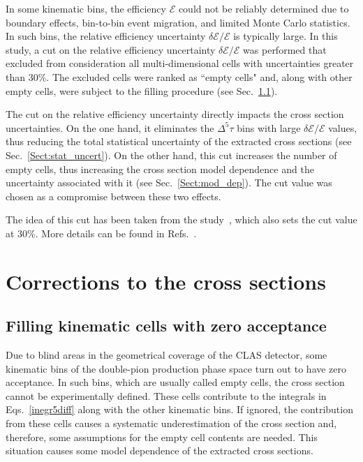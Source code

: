 \documentclass[prc,twocolumn,superscriptaddress,showpacs,amssymb,amsmath,amsfonts,aps,nofootinbib]{revtex4-1}
\begin{document}
In some kinematic bins, the efficiency $\mathcal{E}$ could not be reliably determined due to boundary effects, bin-to-bin event migration, and limited Monte Carlo statistics. In such bins, the relative efficiency uncertainty $\delta \mathcal{E}/\mathcal{E}$ is typically large. In this study, a cut on the relative efficiency uncertainty $\delta \mathcal{E}/\mathcal{E}$ was performed that excluded from consideration all multi-dimensional cells with uncertainties greater than 30\%. The excluded cells were ranked as ``empty cells" and, along with other empty cells, were subject to the filling procedure (see Sec.\!~\ref{Sect:empt_cells}).


The cut on the relative efficiency uncertainty directly impacts the cross section uncertainties. On the one hand, it eliminates the $\Delta^{5} \tau$ bins with large $\delta \mathcal{E}/\mathcal{E}$ values, thus reducing the total statistical uncertainty of the extracted cross sections (see Sec.\!~\ref{Sect:stat_uncert}). On the other hand, this cut increases the number of empty cells, thus increasing the cross section model dependence and the uncertainty associated with it (see Sec.\!~\ref{Sect:mod_dep}). The cut value was chosen as a compromise between these two effects. 

The idea of this cut has been taken from the study~\cite{Fed_an_note:2017,Fed_paper_2018}, which also sets the cut value at 30\%. More details can be found in Refs.\!~\cite{my_an_note:2020, my_thesis:2021,Fed_an_note:2017,Fed_paper_2018}.






\section{Corrections to the cross sections}

\subsection{Filling kinematic cells with zero acceptance}
\label{Sect:empt_cells}


Due to blind areas in the geometrical coverage of the CLAS detector, some kinematic bins of the double-pion production phase space turn out to have zero acceptance. In such bins, which are usually called empty cells, the cross section cannot be experimentally defined. These cells contribute to the integrals in Eqs.\!~\eqref{inegr5diff} along with the other kinematic bins. If ignored, the contribution from these cells causes a systematic underestimation of the cross section and, therefore, some assumptions for the empty cell contents are needed. This situation causes some model dependence of the extracted cross sections. 
\end{document}
